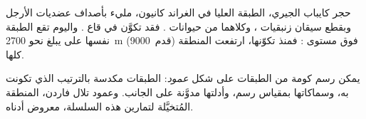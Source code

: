 \begin{example}\label{ex:g7:sediments-and-fossils:kaibab}
حجر كايباب الجيري، الطبقة العليا في الغراند كانيون، مليء بأصداف عضديات
الأرجل وبقطع سيقان زنبقيات ، وكلاهما من حيوانات . فقد تكوَّن في
قاع . واليوم تقع الطبقة نفسها على  يبلغ نحو \qty{2700}{m}
(\num{9000}~قدم) فوق مستوى : فمنذ تكوّنها، ارتفعت المنطقة كلها.
\end{example}

يمكن رسم كومة من الطبقات على شكل \emph{عمود}: الطبقات مكدسة بالترتيب
الذي تكونت به، وسماكاتها بمقياس رسم، وأدلتها مدوَّنة على الجانب. وعمود
تلال فاردن، المنطقة المُتخيَّلة لتمارين هذه السلسلة، معروض أدناه.

